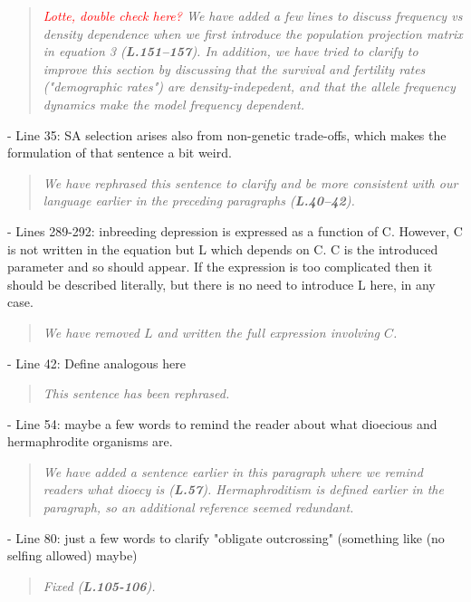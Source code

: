 \documentclass[11pt]{article}
\begin{document}
\begin{quote}
	{\itshape \textcolor{red}{Lotte, double check here?} We have added a few lines to discuss frequency vs density dependence when we first introduce the population projection matrix in equation 3 ({\bf L.151--157}). In addition, we have tried to clarify to improve this section by discussing that the survival and fertility rates ("demographic rates") are density-indepedent, and that the allele frequency dynamics make the model frequency dependent.}
\end{quote}

- Line 35: SA selection arises also from non-genetic trade-offs, which makes the formulation of that sentence a bit weird.

\begin{quote}
	{\itshape We have rephrased this sentence to clarify and be more consistent with our language earlier in the preceding paragraphs ({\bf L.40--42}).}
\end{quote}

- Lines 289-292: inbreeding depression is expressed as a function of C. However, C is not written in the equation but L which depends on C. C is the introduced parameter and so should appear. If the expression is too complicated then it should be described literally, but there is no need to introduce L here, in any case.

\begin{quote}
	{\itshape We have removed $L$ and written the full expression involving $C$.}
\end{quote}

- Line 42: Define analogous here

\begin{quote}
	{\itshape This sentence has been rephrased.}
\end{quote}

- Line 54: maybe a few words to remind the reader about what dioecious and hermaphrodite organisms are.

\begin{quote}
	{\itshape We have added a sentence earlier in this paragraph where we remind readers what dioecy is ({\bf L.57}). Hermaphroditism is defined earlier in the paragraph, so an additional reference seemed redundant.}
\end{quote}

- Line 80: just a few words to clarify "obligate outcrossing" (something like (no selfing allowed) maybe)

\begin{quote}
	{\itshape Fixed ({\bf L.105-106}).}
\end{quote}
\end{document}
